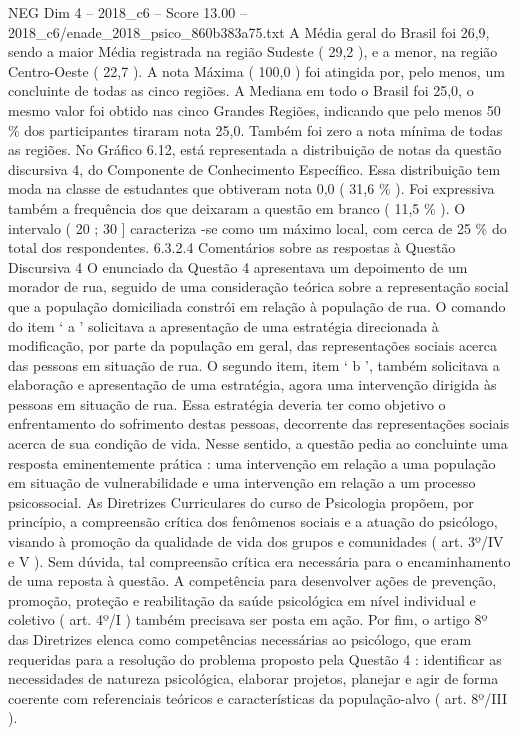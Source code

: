 \begin{textsample}{NEG Dim 4 – 2018\_c6 – Score 13.00 – 2018\_c6/enade\_2018\_psico\_860b383a75.txt}
A Média geral do Brasil foi 26,9, sendo a maior Média registrada na região Sudeste ( 29,2 ), e a menor, na região Centro-Oeste ( 22,7 ).
A nota Máxima ( 100,0 ) foi atingida por, pelo menos, um concluinte de todas as cinco regiões.
A Mediana em todo o Brasil foi 25,0, o mesmo valor foi obtido nas cinco Grandes Regiões, indicando que pelo menos 50 \% dos participantes tiraram nota 25,0.
Também foi zero a nota mínima de todas as regiões.
No Gráfico 6.12, está representada a distribuição de notas da questão discursiva 4, do Componente de Conhecimento Específico.
Essa distribuição tem moda na classe de estudantes que obtiveram nota 0,0 ( 31,6 \% ).
Foi expressiva também a frequência dos que deixaram a questão em branco ( 11,5 \% ).
O intervalo ( 20 ; 30 ] caracteriza -se como um máximo local, com cerca de 25 \% do total dos respondentes. 6.3.2.4 Comentários sobre as respostas à Questão Discursiva 4 O enunciado da Questão 4 apresentava um depoimento de um morador de rua, seguido de uma consideração teórica sobre a representação social que a população domiciliada constrói em relação à população de rua.
O comando do item ‘ a ’ solicitava a apresentação de uma estratégia direcionada à modificação, por parte da população em geral, das representações sociais acerca das pessoas em situação de rua.
O segundo item, item ‘ b ’, também solicitava a elaboração e apresentação de uma estratégia, agora uma intervenção dirigida às pessoas em situação de rua.
Essa estratégia deveria ter como objetivo o enfrentamento do sofrimento destas pessoas, decorrente das representações sociais acerca de sua condição de vida.
Nesse sentido, a questão pedia ao concluinte uma resposta eminentemente prática : uma intervenção em relação a uma população em situação de vulnerabilidade e uma intervenção em relação a um processo psicossocial.
As Diretrizes Curriculares do curso de Psicologia propõem, por princípio, a compreensão crítica dos fenômenos sociais e a atuação do psicólogo, visando à promoção da qualidade de vida dos grupos e comunidades ( art. 3º/IV e V ).
Sem dúvida, tal compreensão crítica era necessária para o encaminhamento de uma reposta à questão.
A competência para desenvolver ações de prevenção, promoção, proteção e reabilitação da saúde psicológica em nível individual e coletivo ( art. 4º/I ) também precisava ser posta em ação.
Por fim, o artigo 8º das Diretrizes elenca como competências necessárias ao psicólogo, que eram requeridas para a resolução do problema proposto pela Questão 4 : identificar as necessidades de natureza psicológica, elaborar projetos, planejar e agir de forma coerente com referenciais teóricos e características da população-alvo ( art. 8º/III ).

\end{textsample}
